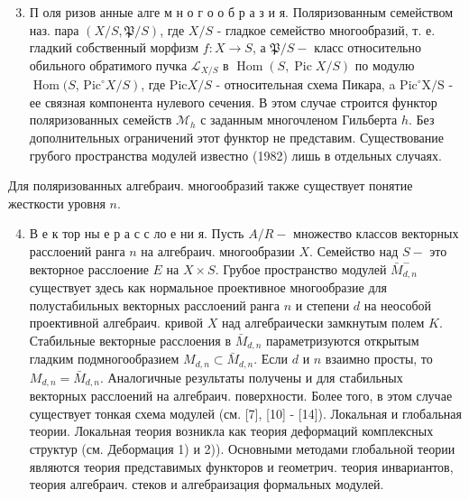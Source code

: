 \documentclass[10pt]{article}
\begin{document}
\begin{enumerate}

  \setcounter{enumi}{2}

  \item П оля ризов анные алге м н о г о о б р а з и я. Поляризованным семейством наз. пара $(X / S, \mathfrak{P} / S)$, где $X / S$ - гладкое семейство многообразий, т. е. гладкий собственный морфизм $f: X \rightarrow S$, а $\mathfrak{P} / S-$ класс относительно обильного обратимого пучка $\mathscr{L}_{X / S}$ в $\operatorname{Hom}(S, \operatorname{Pic} X / S)$ по модулю $\operatorname{Hom}(S$, $\left.\mathrm{Pic}^{\circ} X / S\right)$, где $\mathrm{Pic} X / S$ - относительная схема Пикара, a $\mathrm{Pic}^{\circ} \mathrm{X} / \mathrm{S}$ - ее связная компонента нулевого сечения. В этом случае строится функтор поляризованных семейств $\mathscr{M}_{h}$ с заданным многочленом Гильберта $h$. Без дополнительных ограничений этот функтор не представим. Существование грубого пространства модулей известно (1982) лишь в отдельных случаях.

\end{enumerate}



Для поляризованных алгебраич. многообразий также существует понятие жесткости уровня $n$.



\begin{enumerate}

  \setcounter{enumi}{3}

  \item В е к тор ны е р а с с ло е ни я. Пусть $A / R-$ множество классов векторных расслоений ранга $n$ на алгебраич. многообразии $X$. Семейство над $S-$ это векторное расслоение $E$ на $X \times S$. Грубое пространство модулей $\bar{M}_{d, n}^{-}$существует здесь как нормальное проективное многообразие для полустабильных векторных расслоений ранга $n$ и степени $d$ на неособой проективной алгебраич. кривой $X$ над алгебраически замкнутым полем $K$. Стабильные векторные расслоения в $\bar{M}_{d, n}$ параметризуются открытым гладким подмногообразием $M_{d, n} \subset \bar{M}_{d, n}$. Если $d$ и $n$ взаимно просты, то $M_{d, n}=\bar{M}_{d, n}$. Аналогичные результаты получены и для стабильных векторных расслоений на алгебраич. поверхности. Более того, в этом случае существует тонкая схема модулей (см. [7], [10] - [14]). Локальная и глобальная теории. Локальная теория возникла как теория деформаций комплексных структур (см. Дебормация 1) и 2)). Основными методами глобальной теории являются теория представимых функторов и геометрич. теория инвариантов, теория алгебраич. стеков и алгебраизация формальных модулей.

\end{enumerate}
\end{document}
